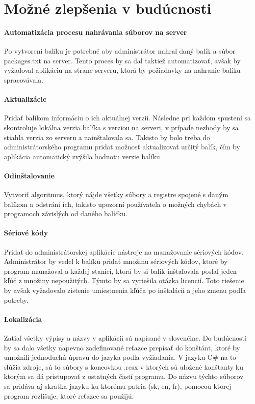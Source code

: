 \section{Možné zlepšenia v budúcnosti}
\label{sec:zlepsenia}
\paragraph{Automatizácia procesu nahrávania súborov na server}
Po vytvorení balíku je potrebné aby administrátor nahral daný balík a súbor packages.txt na server. Tento proces by sa dal taktiež automatizovať, avšak by vyžadoval aplikáciu na strane serveru, ktorá by požiadavky na nahranie balíku spracovávala.

\paragraph{Aktualizácie}
Pridať balíkom informáciu o ich aktuálnej verzií. Následne pri každom spustení sa skontroluje lokálna verzia balíka s verziou na serveri, v prípade nezhody by sa stiahla verzia zo serveru a nainštalovala sa. Takisto by bolo treba do administrátorského programu pridať možnosť aktualizovať určitý balík, čím by aplikácia automatický zvýšila hodnotu verzie balíku

\paragraph{Odinštalovanie}
Vytvoriť algoritmus, ktorý nájde všetky súbory a registre spojené s daným balíkom a odstráni ich, takisto upozorní používateľa o možných chybách v programoch závislých od daného balíčku.

\paragraph{Sériové kódy}
Pridať do administrátorskej aplikácie nástroje na manažovanie sériových kódov. Administrátor by vedel k balíku pridať množinu sériových kódov, ktoré by program manažoval a každej stanici, ktorá by si balík inštalovala poslal jeden kľúč z množiny nepoužitých. Týmto by sa vyriešila otázka licencií. Toto riešenie by avšak vyžadovalo zistenie umiestnenia kľúča po inštalácii a jeho zmenu podľa potreby.

\paragraph{Lokalizácia}
Zatiaľ všetky výpisy a názvy v aplikácií sú napísané v slovenčine. Do budúcnosti by sa dalo všetky napevno zadefinované reťazce prepísať do konštánt, ktoré by umožnili jednoduchú úpravu do jazyka podľa vyžiadania. V jazyku C\# na to slúžia zdroje, sú to súbory s koncovkou .resx v ktorých sú uložené konštanty ku ktorým sa dá pristupovať z ostatných častí programu. Do názvu týchto súborov sa pridáva aj skratka jazyku ku ktorému patria (sk, en, fr), pomocou ktorej program rozlišuje, ktoré reťazce sa použijú.